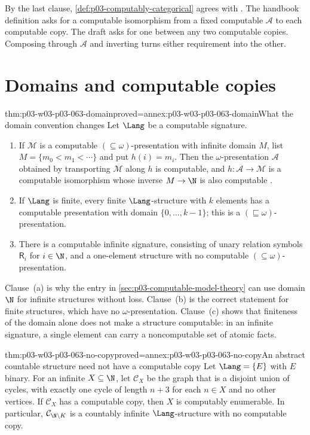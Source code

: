 By the last clause, \cref{def:p03-computably-categorical} agrees with
\cite[Definition~VIII.1, p.~123]{Montalban2019CSTDraft}.  The handbook
definition asks for a computable isomorphism from a fixed computable
\(\mathcal A\) to each computable copy.  The draft asks for one between any
two computable copies.  Composing through \(\mathcal A\) and inverting turns
either requirement into the other.

\section{Domains and computable copies}
\label{sec:p03-w03-p03-063-domains}

\begin{hbtheorem}{thm:p03-w03-p03-063-domain}{proved=annex:p03-w03-p03-063-domain}{What the domain convention changes}
Let \(\Lang\) be a computable signature.
\begin{enumerate}
\item If \(\mathcal M\) is a computable \((\subseteq\omega)\)-presentation
  with infinite domain \(M\), list \(M=\{m_0<m_1<\cdots\}\) and put
  \(h(i)=m_i\).  Then the \(\omega\)-presentation \(\mathcal A\) obtained by
  transporting \(\mathcal M\) along \(h\) is computable, and
  \(h:\mathcal A\to\mathcal M\) is a computable isomorphism whose inverse
  \(M\to\N\) is also computable \cite[Observation~I.3, pp.~3--4]{Montalban2019CSTDraft}.
\item If \(\Lang\) is finite, every finite \(\Lang\)-structure with \(k\)
  elements has a computable presentation with domain \(\{0,\ldots,k-1\}\);
  this is a \((\sqsubseteq\omega)\)-presentation.
\item There is a computable infinite signature, consisting of unary relation
  symbols \(\mathsf R_i\) for \(i\in\N\), and a one-element structure with no
  computable \((\subseteq\omega)\)-presentation.
\end{enumerate}
\end{hbtheorem}

Clause~(a) is why the entry in \cref{sec:p03-computable-model-theory} can use
domain \(\N\) for infinite structures without loss.  Clause~(b) is the
correct statement for finite structures, which have no
\(\omega\)-presentation.  Clause~(c) shows that finiteness of the domain alone
does not make a structure computable: in an infinite signature, a single
element can carry a noncomputable set of atomic facts.

\begin{hbtheorem}{thm:p03-w03-p03-063-no-copy}{proved=annex:p03-w03-p03-063-no-copy}{An abstract countable structure need not have a computable copy}
Let \(\Lang=\{E\}\) with \(E\) binary.  For an infinite \(X\subseteq\N\), let
\(\mathcal C_X\) be the graph that is a disjoint union of cycles, with
exactly one cycle of length \(n+3\) for each \(n\in X\) and no other
vertices.  If \(\mathcal C_X\) has a computable copy, then \(X\) is
computably enumerable.  In particular, \(\mathcal C_{\N\setminus K}\) is a
countably infinite \(\Lang\)-structure with no computable copy.
\end{hbtheorem}

